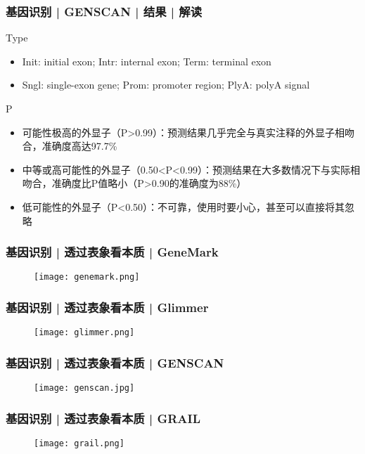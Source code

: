 \begin{frame}
  \frametitle{基因识别 | GENSCAN | 结果 | 解读}
  \begin{block}{Type}
    \begin{itemize}
      \item Init: initial exon; Intr: internal exon; Term: terminal exon
      \item Sngl: single-exon gene; Prom: promoter region; PlyA: polyA signal
    \end{itemize}
  \end{block}
  \pause
  \begin{block}{P}
  \begin{itemize}
    \item 可能性极高的外显子（P>0.99）：预测结果几乎完全与真实注释的外显子相吻合，准确度高达97.7\%
    \item 中等或高可能性的外显子（0.50<P<0.99）：预测结果在大多数情况下与实际相吻合，准确度比P值略小（P>0.90的准确度为88\%）
    \item 低可能性的外显子（P<0.50）：不可靠，使用时要小心，甚至可以直接将其忽略
  \end{itemize}
  \end{block}
\end{frame}

\begin{frame}
  \frametitle{基因识别 | 透过表象看本质 | GeneMark}
  \begin{figure}
    \centering
    \texttt{[image: genemark.png]}
  \end{figure}
\end{frame}

\begin{frame}
  \frametitle{基因识别 | 透过表象看本质 | Glimmer}
  \begin{figure}
    \centering
    \texttt{[image: glimmer.png]}
  \end{figure}
\end{frame}

\begin{frame}
  \frametitle{基因识别 | 透过表象看本质 | GENSCAN}
  \begin{figure}
    \centering
    \texttt{[image: genscan.jpg]}
  \end{figure}
\end{frame}

\begin{frame}
  \frametitle{基因识别 | 透过表象看本质 | GRAIL}
  \begin{figure}
    \centering
    \texttt{[image: grail.png]}
  \end{figure}
\end{frame}

